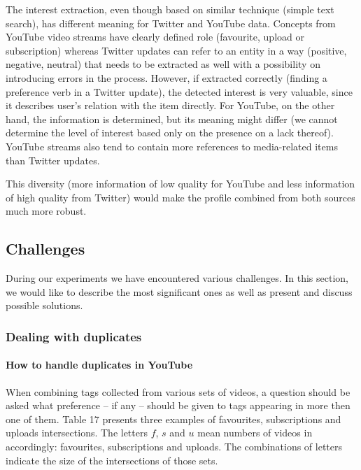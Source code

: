 The interest extraction, even though based on similar technique (simple text
search), has different meaning for Twitter and YouTube data.  Concepts from
YouTube video streams have clearly defined role (favourite, upload or
subscription) whereas Twitter updates can refer to an entity in a way (positive,
negative, neutral) that needs to be extracted as well with a possibility on
introducing errors in the process. However, if extracted correctly (finding a
preference verb in a Twitter update), the detected interest is very valuable,
since it describes user's relation with the item directly. For YouTube, on the
other hand, the information is determined, but its meaning might differ (we
cannot determine the level of interest based only on the presence on a lack
thereof). YouTube streams also tend to contain more references to media-related
items than Twitter updates. 

This diversity (more information of low quality for YouTube and less
information of high quality from Twitter) would make the profile combined from
both sources much more robust.

\subsection{Challenges}

During our experiments we have encountered various challenges. In this section, we would like to describe
the most significant ones as well as present and discuss possible solutions.

\subsubsection{Dealing with duplicates}

\paragraph{How to handle duplicates in YouTube}

When combining tags collected from various sets of videos, a question should be
asked what preference -- if any -- should be given to tags appearing in more
then one of them. Table 17 presents three examples of favourites,
subscriptions and uploads intersections. The letters $f$, $s$ and $u$ mean
numbers of videos in accordingly: favourites, subscriptions and uploads. The
combinations of letters indicate the size of the intersections of those sets. \\

